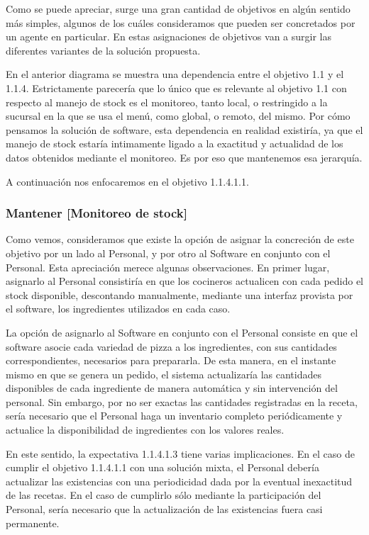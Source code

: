 \documentclass[a4paper,10pt]{article}
\begin{document}
\begin{figure}[H]
\centering
{}
\caption{}
\end{figure}

Como se puede apreciar, surge una gran cantidad de objetivos en algún sentido más simples, algunos de los cuáles consideramos que pueden ser concretados por un agente en particular. En estas asignaciones de objetivos van a surgir las diferentes variantes de la solución propuesta. 

En el anterior diagrama se muestra una dependencia entre el objetivo 1.1 y el 1.1.4. Estrictamente parecería que lo único que es relevante al objetivo 1.1 con respecto al manejo de stock es el monitoreo, tanto local, o restringido a la sucursal en la que se usa el menú, como global, o remoto, del mismo. Por cómo pensamos la solución de software, esta dependencia en realidad existiría, ya que el manejo de stock estaría intimamente ligado a la exactitud y actualidad de los datos obtenidos mediante el monitoreo. Es por eso que mantenemos esa jerarquía.


A continuación nos enfocaremos en el objetivo 1.1.4.1.1. 
\subsubsection*{Mantener [Monitoreo de stock]}
Como vemos, consideramos que existe la opción de asignar la concreción de este objetivo por un lado al Personal, y por otro al Software en conjunto con el Personal. Esta apreciación merece algunas observaciones.
En primer lugar, asignarlo al Personal consistiría en que los cocineros actualicen con cada pedido el stock disponible, descontando manualmente, mediante una interfaz provista por el software, los ingredientes utilizados en cada caso.  


La opción de asignarlo al Software en conjunto con el Personal consiste en que el software asocie cada variedad de pizza a los ingredientes, con sus cantidades correspondientes, necesarios para prepararla. De esta manera, en el instante mismo en que se genera un pedido, el sistema actualizaría las cantidades disponibles de cada ingrediente de manera automática y sin intervención del personal. Sin embargo, por no ser exactas las cantidades registradas en la receta, sería necesario que el Personal haga un inventario completo periódicamente y actualice la disponibilidad de ingredientes con los valores reales.

En este sentido, la expectativa 1.1.4.1.3 tiene varias implicaciones. En el caso de cumplir el objetivo 1.1.4.1.1 con una solución mixta, el Personal debería actualizar las existencias con una periodicidad dada por la eventual inexactitud de las recetas. En el caso de cumplirlo sólo mediante la participación del Personal, sería necesario que la actualización de las existencias fuera casi permanente.
\end{document}
